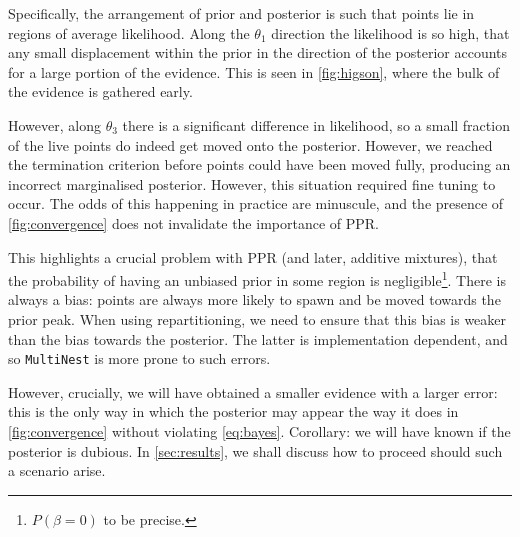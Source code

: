 \documentclass[usenatbib]{mnras}
\begin{document}
Specifically, the arrangement of prior and posterior is such that
points lie in regions of average likelihood. Along the $\theta_{1}$
direction the likelihood is so high, that any small displacement
within the prior in the direction of the posterior accounts for a
large portion of the evidence. This is seen in \cref{fig:higson},
where the bulk of the evidence is gathered early.

However, along $\theta_{3}$ there is a significant difference in
likelihood, so a small fraction of the live points do indeed get moved
onto the posterior. However, we reached the termination criterion
before points could have been moved fully, producing an incorrect
marginalised posterior. However, this situation required fine tuning
to occur. The odds of this happening in practice are minuscule, and
the presence of \cref{fig:convergence} does not invalidate the
importance of PPR. 



This highlights a crucial problem with PPR (and later, additive
mixtures), that the probability of having an unbiased prior in some
region is negligible\footnote{ \(P(\beta=0)\) to be precise.}. There is
always a bias: points are always more likely to spawn and be moved
towards the prior peak. When using repartitioning, we need to ensure
that this bias is weaker than the bias towards the posterior. The
latter is implementation dependent, and so \texttt{MultiNest} is more
prone to such errors.

However, crucially, we will have obtained a smaller evidence with a
larger error: this is the only way in which the posterior may appear
the way it does in \cref{fig:convergence} without violating
\cref{eq:bayes}. Corollary: we will have known if the posterior is
dubious. In \cref{sec:results}, we shall discuss how to proceed should
such a scenario arise.
\end{document}
